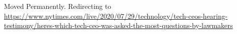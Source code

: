 Moved Permanently. Redirecting to
\href{https://www.nytimes.com/live/2020/07/29/technology/tech-ceos-hearing-testimony/heres-which-tech-ceo-was-asked-the-most-questions-by-lawmakers}{https://www.nytimes.com/live/2020/07/29/technology/tech-ceos-hearing-testimony/heres-which-tech-ceo-was-asked-the-most-questions-by-lawmakers}
